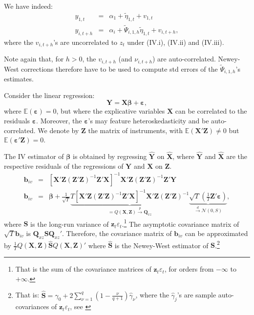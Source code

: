 \documentclass[
  12pt,
]{book}
\theoremstyle{definition}
\theoremstyle{definition}
\theoremstyle{definition}
\theoremstyle{definition}
\theoremstyle{remark}
\begin{document}
We have indeed:
\begin{eqnarray*}
y_{1,t} &=& \alpha_1 + \tilde\eta_{1,t} + v_{1,t}\\
y_{i,t+h} &=& \alpha_i + \tilde\Psi_{i,1,h}\tilde\eta_{1,t} + v_{i,t+h},
\end{eqnarray*}
where the \(v_{i,t+h}\)'s are uncorrelated to \(z_t\) under (IV.i), (IV.ii) and (IV.iii).

Note again that, for \(h>0\), the \(v_{i,t+h}\) (and \(\nu_{i,t+h}\)) are auto-correlated. Newey-West corrections therefore have to be used to compute std errors of the \(\tilde\Psi_{i,1,h}\)'s estimates.

Consider the linear regression:
\[
\mathbf{Y} = \mathbf{X}\boldsymbol\beta + \boldsymbol\varepsilon,
\]
where \(\mathbb{E}(\boldsymbol\varepsilon)=0\), but where the explicative variables \(\mathbf{X}\) can be correlated to the residuals \(\boldsymbol\varepsilon\). Moreover, the \(\boldsymbol\varepsilon\)'s may feature heteroskedasticity and be auto-correlated. We denote by \(\mathbf{Z}\) the matrix of instruments, with \(\mathbb{E}(\mathbf{X}'\mathbf{Z}) \ne 0\) but \(\mathbb{E}(\boldsymbol\varepsilon'\mathbf{Z}) = 0\).

The IV estimator of \(\boldsymbol\beta\) is obtained by regressing \(\hat{\mathbf{Y}}\) on \(\hat{\mathbf{X}}\), where \(\hat{\mathbf{Y}}\) and \(\hat{\mathbf{X}}\) are the respective residuals of the regressions of \(\mathbf{Y}\) and \(\mathbf{X}\) on \(\mathbf{Z}\).
\begin{eqnarray*}
\mathbf{b}_{iv} &=& [\mathbf{X}'\mathbf{Z}(\mathbf{Z}'\mathbf{Z})^{-1}\mathbf{Z}'\mathbf{X}]^{-1}\mathbf{X}'\mathbf{Z}(\mathbf{Z}'\mathbf{Z})^{-1}\mathbf{Z}'\mathbf{Y}\\
\mathbf{b}_{iv} &=& \boldsymbol\beta + \frac{1}{\sqrt{T}}\underbrace{T[\mathbf{X}'\mathbf{Z}(\mathbf{Z}'\mathbf{Z})^{-1}\mathbf{Z}'\mathbf{X}]^{-1}\mathbf{X}'\mathbf{Z}(\mathbf{Z}'\mathbf{Z})^{-1}}_{=Q(\mathbf{X},\mathbf{Z}) \overset{p}{\rightarrow} \mathbf{Q}_{xz}}\underbrace{\sqrt{T}\left(\frac{1}{T}\mathbf{Z}'\boldsymbol\varepsilon\right)}_{\overset{d}{\rightarrow} \mathcal{N}(0,S)},
\end{eqnarray*}
where \(\mathbf{S}\) is the long-run variance of \(\mathbf{z}_t\varepsilon_t\).\footnote{That is the sum of the covariance matrices of \(\mathbf{z}_t\varepsilon_t\), for orders from \(-\infty\) to \(+\infty\).} The asymptotic covariance matrix of \(\sqrt{T}\mathbf{b}_{iv}\) is \(\mathbf{Q}_{xz} \mathbf{S} \mathbf{Q}_{xz}'\). Therefore, the covariance matrix of \(\mathbf{b}_{iv}\) can be approximated by \(\frac{1}{T}Q(\mathbf{X},\mathbf{Z})\hat{\mathbf{S}}Q(\mathbf{X},\mathbf{Z})'\) where \(\hat{\mathbf{S}}\) is the Newey-West estimator of \(\mathbf{S}\).\footnote{That is: \(\hat{\mathbf{S}}=\hat\gamma_0 + 2 \sum_{\nu=1}^{q}\left(1-\frac{\nu}{q+1}\right) \hat\gamma_\nu\), where the \(\hat\gamma_j\)'s are sample auto-covariances of \(\mathbf{z}_t\varepsilon_t\), see \citet{Newey_West_1987}}
\end{document}
